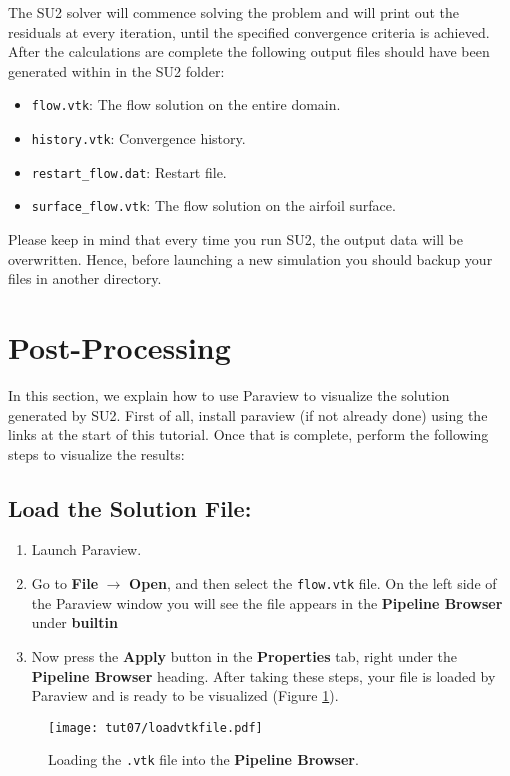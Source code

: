 The SU2 solver will commence solving the problem and will print out the residuals at every iteration, until the specified convergence criteria is achieved. After the calculations are complete the following output files should have been generated within in the SU2 folder:
\begin{itemize}
	\item \texttt{flow.vtk}: The flow solution on the entire domain.
	\item \texttt{history.vtk}: Convergence history.
	\item \texttt{restart\_flow.dat}: Restart file.
	\item \texttt{surface\_flow.vtk}: The flow solution on the airfoil surface.
\end{itemize}
Please keep in mind that every time you run SU2, the output data will be overwritten. Hence, before launching a new simulation you should backup your files in another directory.
\section{Post-Processing}
In this section, we explain how to use Paraview to visualize the solution generated by SU2. First of all, install paraview (if not already done) using the links at the start of this tutorial. Once that is complete, perform the following steps to visualize the results:
\subsection{Load the Solution File:}
\begin{enumerate}[label=\arabic*)]
	\item Launch Paraview.
	\item Go to \textbf{File} $\rightarrow$ \textbf{Open}, and then select the \texttt{flow.vtk} file. On the left side of the Paraview window you will see the file appears in the \textbf{Pipeline Browser} under \textbf{builtin}
	\item Now press the \textbf{Apply} button in the \textbf{Properties} tab, right under the \textbf{Pipeline Browser} heading. After taking these steps, your file is loaded by Paraview and is ready to be visualized (Figure \ref{fig7:load}).
\end{enumerate}
\begin{figure}[ht]
	\centering
	\texttt{[image: tut07/loadvtkfile.pdf]}
	\caption{Loading the \texttt{.vtk} file into the \textbf{Pipeline Browser}.}
	\label{fig7:load}
\end{figure}
